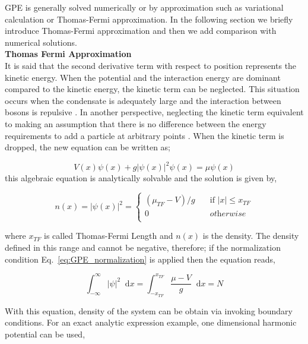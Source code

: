 \documentclass[a4paper,times,hidelinks,12pt]{article}
\newcommand*\dif{\mathop{}\!\mathrm{d}}
\begin{document}
GPE is generally solved numerically or by approximation such as variational calculation or Thomas-Fermi approximation. In the following section we briefly introduce Thomas-Fermi approximation and then we add comparison with numerical solutions. \\

\textbf{Thomas Fermi Approximation}\\


It is said that the second derivative term with respect to position represents the kinetic energy. When the potential and the interaction energy are dominant compared to the kinetic energy, the kinetic term can be neglected. This situation occurs when the condensate is adequately large and the interaction between bosons is repulsive \cite{pethick2002bose}. In another perspective, neglecting the kinetic term equivalent to making an assumption that there is no difference between the energy requirements to add a particle at arbitrary points \cite{rogel2013gross}. When the kinetic term is dropped, the new equation can be written as;

\begin{equation}
\label{eq:GPE_1D_thomas_fermi}
    V(x)\psi(x) + g|\psi(x)|^2\psi(x) = \mu\psi(x)
\end{equation}
\noindent this algebraic equation is analytically solvable and the solution is given by,


\begin{equation}
\label{eq:thomas_fermi_solution}    
n(x) = |\psi(x)|^2 =  
    \begin{cases}
        (\mu_{TF} - V)/g &\quad\text{if }  |x| \le x_{TF}  \\
        0 &\quad \textit{otherwise} \\
    \end{cases}
\end{equation}

\noindent where $x_{TF}$ is called Thomas-Fermi Length and $n(x)$ is the density. The density defined in this range and cannot be negative, therefore; if the normalization condition Eq.~\eqref{eq:GPE_normalization} is applied then the equation reads,  

\begin{equation}
    \label{eq:thomas_fermi_mu_integral}
        \int_{-\infty}^{\infty} |\psi|^2 \dif x = \int_{-x_{TF}}^{x_{TF}} \frac{\mu - V}{g} \dif x = N 
    \end{equation}

\noindent With this equation, density of the system can be obtain via invoking boundary conditions. For an exact analytic expression example, one dimensional harmonic potential can be used, 
\end{document}
